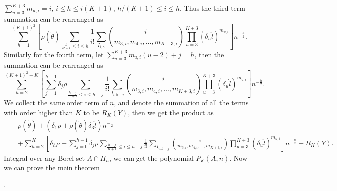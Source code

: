 $\sum_{u=3}^{K+3}m_{u,i}=i$, $i\le h\le i\left(K+1\right)$, $h/\left(K+1\right)\le i\le h$.
Thus the third term summation can be rearranged as 
\[
\sum_{h=1}^{\left(K+1\right)^{2}}\left[\rho\left(\tilde{\theta}\right)\sum_{\frac{h}{K+1}\le i\le h}\frac{1}{i!}\sum_{I_{i,h}}\binom{i}{m_{3,i},m_{4,i},\ldots,m_{K+3,i}}\prod_{u=3}^{K+3}\left(\delta_{u}\hat{l}\right)^{m_{u,i}}\right]n^{-\frac{h}{2}}.
\]
Similarly for the fourth term, let $\sum_{u=3}^{K+3}m_{u,i}\left(u-2\right)+j=h$,
then the summation can be rearranged as 
\[
\sum_{h=2}^{\left(K+1\right)^{2}+K}\left[\sum_{j=1}^{h-1}\delta_{j}\rho\sum_{\frac{h-j}{K+1}\le i\le h-j}\frac{1}{i!}\sum_{I_{i,h-j}}\binom{i}{m_{3,i},m_{4,i},\ldots,m_{K+3,i}}\prod_{u=3}^{K+3}\left(\delta_{u}\hat{l}\right)^{m_{u,i}}\right]n^{-\frac{h}{2}}.
\]
We collect the same order term of $n$, and denote the summation of
all the terms with order higher than $K$ to be $R_{K}\left(Y\right)$,
then we get the product as 
\begin{eqnarray*}
 &  & \rho\left(\tilde{\theta}\right)+\left(\delta_{1}\rho+\rho\left(\tilde{\theta}\right)\delta_{3}\hat{l}\right)n^{-\frac{1}{2}}\\
 &  & +\sum_{h=2}^{K}\left[\delta_{h}\rho+\sum_{j=0}^{h-1}\delta_{j}\rho\sum_{\frac{h-j}{K+1}\le i\le h-j}\frac{1}{i!}\sum_{I_{i,h-j}}\binom{i}{m_{3,i},m_{4,i},\ldots,m_{K+3,i}}\prod_{u=3}^{K+3}\left(\delta_{u}\hat{l}\right)^{m_{u,i}}\right]n^{-\frac{h}{2}}+R_{K}\left(Y\right).
\end{eqnarray*}
 Integral over any Borel set $A\cap H_{n}$, we can get the polynomial
$P_{K}\left(A,n\right)$. Now we can prove the main theorem %
\begin{comment}
add ref to main theorem
\end{comment}
. 
